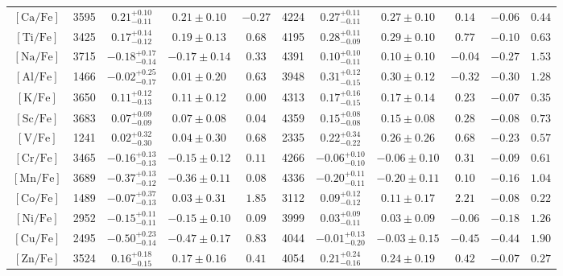 \begin{table*}
\begin{tabular}{c|cccc|cccc|cc}
$\mathrm{[Ca/Fe]}$ & 3595 & $0.21_{-0.11}^{+0.10}$ & $0.21 \pm 0.10$ & $-0.27$ & 4224 & $0.27_{-0.11}^{+0.11}$ & $0.27 \pm 0.10$ & $0.14$ & $-0.06$ & $0.44$  \\
$\mathrm{[Ti/Fe]}$ & 3425 & $0.17_{-0.12}^{+0.14}$ & $0.19 \pm 0.13$ & $0.68$ & 4195 & $0.28_{-0.09}^{+0.11}$ & $0.29 \pm 0.10$ & $0.77$ & $-0.10$ & $0.63$  \\
\hline
$\mathrm{[Na/Fe]}$ & 3715 & $-0.18_{-0.14}^{+0.17}$ & $-0.17 \pm 0.14$ & $0.33$ & 4391 & $0.10_{-0.11}^{+0.10}$ & $0.10 \pm 0.10$ & $-0.04$ & $-0.27$ & $1.53$  \\
$\mathrm{[Al/Fe]}$ & 1466 & $-0.02_{-0.17}^{+0.25}$ & $0.01 \pm 0.20$ & $0.63$ & 3948 & $0.31_{-0.15}^{+0.12}$ & $0.30 \pm 0.12$ & $-0.32$ & $-0.30$ & $1.28$  \\
$\mathrm{[K/Fe]}$ & 3650 & $0.11_{-0.13}^{+0.12}$ & $0.11 \pm 0.12$ & $0.00$ & 4313 & $0.17_{-0.15}^{+0.16}$ & $0.17 \pm 0.14$ & $0.23$ & $-0.07$ & $0.35$  \\
\hline
$\mathrm{[Sc/Fe]}$ & 3683 & $0.07_{-0.09}^{+0.09}$ & $0.07 \pm 0.08$ & $0.04$ & 4359 & $0.15_{-0.08}^{+0.08}$ & $0.15 \pm 0.08$ & $0.28$ & $-0.08$ & $0.73$  \\
$\mathrm{[V/Fe]}$ & 1241 & $0.02_{-0.30}^{+0.32}$ & $0.04 \pm 0.30$ & $0.68$ & 2335 & $0.22_{-0.22}^{+0.34}$ & $0.26 \pm 0.26$ & $0.68$ & $-0.23$ & $0.57$  \\
$\mathrm{[Cr/Fe]}$ & 3465 & $-0.16_{-0.13}^{+0.13}$ & $-0.15 \pm 0.12$ & $0.11$ & 4266 & $-0.06_{-0.10}^{+0.10}$ & $-0.06 \pm 0.10$ & $0.31$ & $-0.09$ & $0.61$  \\
$\mathrm{[Mn/Fe]}$ & 3689 & $-0.37_{-0.12}^{+0.13}$ & $-0.36 \pm 0.11$ & $0.08$ & 4336 & $-0.20_{-0.11}^{+0.11}$ & $-0.20 \pm 0.11$ & $0.10$ & $-0.16$ & $1.04$  \\
$\mathrm{[Co/Fe]}$ & 1489 & $-0.07_{-0.13}^{+0.37}$ & $0.03 \pm 0.31$ & $1.85$ & 3112 & $0.09_{-0.12}^{+0.12}$ & $0.11 \pm 0.17$ & $2.21$ & $-0.08$ & $0.22$  \\
$\mathrm{[Ni/Fe]}$ & 2952 & $-0.15_{-0.11}^{+0.11}$ & $-0.15 \pm 0.10$ & $0.09$ & 3999 & $0.03_{-0.11}^{+0.09}$ & $0.03 \pm 0.09$ & $-0.06$ & $-0.18$ & $1.26$  \\
$\mathrm{[Cu/Fe]}$ & 2495 & $-0.50_{-0.14}^{+0.23}$ & $-0.47 \pm 0.17$ & $0.83$ & 4044 & $-0.01_{-0.20}^{+0.13}$ & $-0.03 \pm 0.15$ & $-0.45$ & $-0.44$ & $1.90$  \\
$\mathrm{[Zn/Fe]}$ & 3524 & $0.16_{-0.15}^{+0.18}$ & $0.17 \pm 0.16$ & $0.41$ & 4054 & $0.21_{-0.16}^{+0.24}$ & $0.24 \pm 0.19$ & $0.42$ & $-0.07$ & $0.27$  \\

\end{tabular}
\end{table*}

